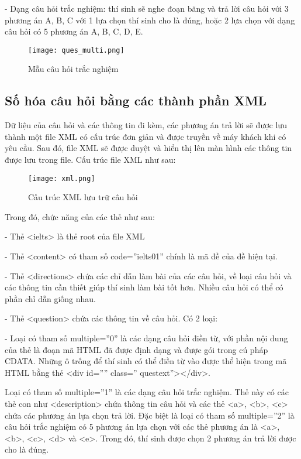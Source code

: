 \quad - Dạng câu hỏi trắc nghiệm: thí sinh sẽ nghe đoạn băng và trả lời câu hỏi với 3 phương án A, B, C với 1 lựa chọn thí sinh cho là đúng, hoặc 2 lựa chọn với dạng câu hỏi có 5 phương án A, B, C, D, E.

\begin{figure}[!htb] 
\centering
\texttt{[image: ques\_multi.png]}
\caption{Mẫu câu hỏi trắc nghiệm}
\end{figure}

\subsection{Số hóa câu hỏi bằng các thành phần XML}

Dữ liệu của câu hỏi và các thông tin đi kèm, các phương án trả lời sẽ được lưu thành một file XML có cấu trúc đơn giản và được truyền về máy khách khi có yêu cầu. Sau đó, file XML sẽ được duyệt và hiển thị lên màn hình các thông tin được lưu trong file. Cấu trúc file XML như sau:

\begin{figure}[!htb] 
\centering
\texttt{[image: xml.png]}
\caption{Cấu trúc XML lưu trữ câu hỏi}
\end{figure}

Trong đó, chức năng của các thẻ như sau:

\quad - Thẻ <ielts> là thẻ root của file XML

\quad - Thẻ <content> có tham số code=”ielts01” chính là mã đề của đề hiện tại.

\quad - Thẻ <directions> chứa các chỉ dẫn làm bài của các câu hỏi, về loại câu hỏi và các thông tin cần thiết giúp thí sinh làm bài tốt hơn. Nhiều câu hỏi có thể có phần chỉ dẫn giống nhau.

\quad - Thẻ <question> chứa các thông tin về câu hỏi. Có 2 loại:

\quad\quad - Loại có tham số multiple=”0” là các dạng câu hỏi điền từ, với phần nội dung của thẻ là đoạn mã HTML đã được định dạng và được gói trong cú pháp CDATA. Những ô trống để thí sinh có thể điền từ vào được thể hiện trong mã HTML bằng thẻ <div id=”” class=” questext”></div>.

Loại có tham số multiple=”1” là các dạng câu hỏi trắc nghiệm. Thẻ này có các thẻ con như <description> chứa thông tin câu hỏi và các thẻ <a>, <b>, <c> chứa các phương án lựa chọn trả lời. Đặc biệt là loại có tham số multiple=”2” là câu hỏi trắc nghiệm có 5 phương án lựa chọn với các thẻ phương án là <a>, <b>, <c>, <d> và <e>. Trong đó, thí sinh được chọn 2 phương án trả lời được cho là đúng.

